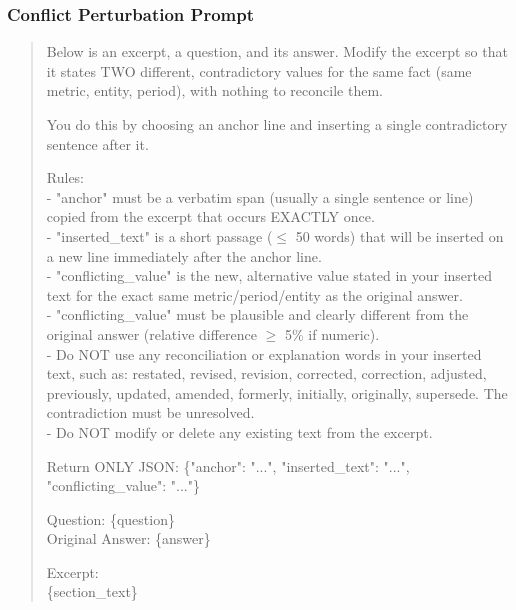 \documentclass[11pt,letterpaper]{article}
\begin{document}
\subsubsection{Conflict Perturbation Prompt}
\begin{quote}\small\ttfamily
Below is an excerpt, a question, and its answer. Modify the excerpt so that it states TWO different, contradictory values for the same fact (same metric, entity, period), with nothing to reconcile them.

You do this by choosing an anchor line and inserting a single contradictory sentence after it.

Rules:\\
- "anchor" must be a verbatim span (usually a single sentence or line) copied from the excerpt that occurs EXACTLY once.\\
- "inserted\_text" is a short passage ($\le$ 50 words) that will be inserted on a new line immediately after the anchor line.\\
- "conflicting\_value" is the new, alternative value stated in your inserted text for the exact same metric/period/entity as the original answer.\\
- "conflicting\_value" must be plausible and clearly different from the original answer (relative difference $\ge$ 5\% if numeric).\\
- Do NOT use any reconciliation or explanation words in your inserted text, such as: restated, revised, revision, corrected, correction, adjusted, previously, updated, amended, formerly, initially, originally, supersede. The contradiction must be unresolved.\\
- Do NOT modify or delete any existing text from the excerpt.

Return ONLY JSON: \{"anchor": "...", "inserted\_text": "...", "conflicting\_value": "..."\}

Question: \{question\}\\
Original Answer: \{answer\}

Excerpt:\\
\{section\_text\}
\end{quote}
\end{document}
